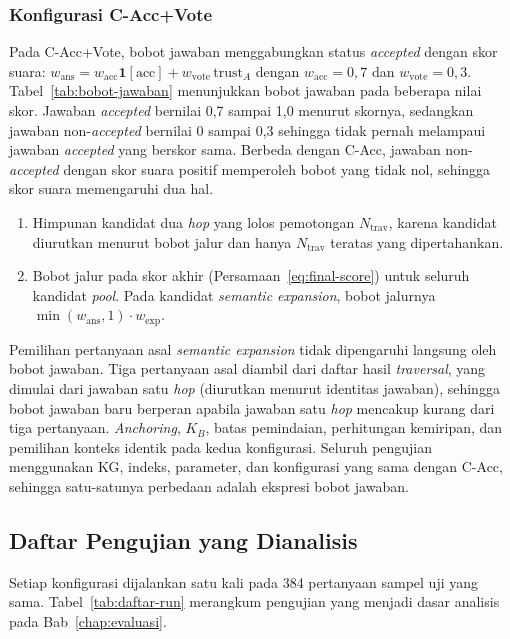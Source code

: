 \subsubsection{Konfigurasi C-Acc+Vote}
\label{subsubsec:implementasi-c-acc-vote}

Pada C-Acc+Vote, bobot jawaban menggabungkan status \emph{accepted} dengan skor suara: $w_{\mathrm{ans}}=w_{\mathrm{acc}}\mathbf{1}[\mathrm{acc}]+w_{\mathrm{vote}}\,\mathrm{trust}_A$ dengan $w_{\mathrm{acc}}=0{,}7$ dan $w_{\mathrm{vote}}=0{,}3$. Tabel~\ref{tab:bobot-jawaban} menunjukkan bobot jawaban pada beberapa nilai skor. Jawaban \emph{accepted} bernilai 0,7 sampai 1,0 menurut skornya, sedangkan jawaban non-\emph{accepted} bernilai 0 sampai 0,3 sehingga tidak pernah melampaui jawaban \emph{accepted} yang berskor sama. Berbeda dengan C-Acc, jawaban non-\emph{accepted} dengan skor suara positif memperoleh bobot yang tidak nol, sehingga skor suara memengaruhi dua hal.
\begin{enumerate}
    \item Himpunan kandidat dua \emph{hop} yang lolos pemotongan $N_{\mathrm{trav}}$, karena kandidat diurutkan menurut bobot jalur dan hanya $N_{\mathrm{trav}}$ teratas yang dipertahankan.
    \item Bobot jalur pada skor akhir (Persamaan~\eqref{eq:final-score}) untuk seluruh kandidat \emph{pool}. Pada kandidat \emph{semantic expansion}, bobot jalurnya $\min(w_{\mathrm{ans}},1)\cdot w_{\mathrm{exp}}$.
\end{enumerate}
Pemilihan pertanyaan asal \emph{semantic expansion} tidak dipengaruhi langsung oleh bobot jawaban. Tiga pertanyaan asal diambil dari daftar hasil \emph{traversal}, yang dimulai dari jawaban satu \emph{hop} (diurutkan menurut identitas jawaban), sehingga bobot jawaban baru berperan apabila jawaban satu \emph{hop} mencakup kurang dari tiga pertanyaan. \emph{Anchoring}, $K_B$, batas pemindaian, perhitungan kemiripan, dan pemilihan konteks identik pada kedua konfigurasi. Seluruh pengujian menggunakan KG, indeks, parameter, dan konfigurasi yang sama dengan C-Acc, sehingga satu-satunya perbedaan adalah ekspresi bobot jawaban.


\subsection{Daftar Pengujian yang Dianalisis}
\label{subsec:daftar-run}

Setiap konfigurasi dijalankan satu kali pada 384 pertanyaan sampel uji yang sama. Tabel~\ref{tab:daftar-run} merangkum pengujian yang menjadi dasar analisis pada Bab~\ref{chap:evaluasi}.

